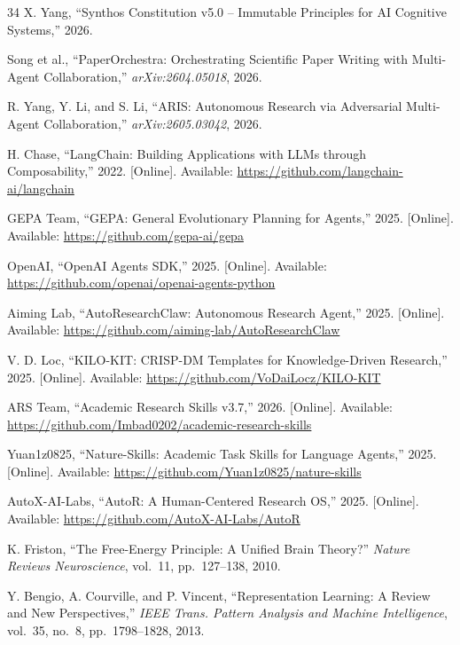 \documentclass[review]{elsarticle}
\begin{document}
\begin{thebibliography}{34}
X. Yang, ``Synthos Constitution v5.0 -- Immutable Principles for AI Cognitive Systems,'' 2026.

Song et al., ``PaperOrchestra: Orchestrating Scientific Paper Writing with Multi-Agent Collaboration,'' \textit{arXiv:2604.05018}, 2026.

R. Yang, Y. Li, and S. Li, ``ARIS: Autonomous Research via Adversarial Multi-Agent Collaboration,'' \textit{arXiv:2605.03042}, 2026.

H. Chase, ``LangChain: Building Applications with LLMs through Composability,'' 2022. [Online]. Available: \url{https://github.com/langchain-ai/langchain}

GEPA Team, ``GEPA: General Evolutionary Planning for Agents,'' 2025. [Online]. Available: \url{https://github.com/gepa-ai/gepa}

OpenAI, ``OpenAI Agents SDK,'' 2025. [Online]. Available: \url{https://github.com/openai/openai-agents-python}

Aiming Lab, ``AutoResearchClaw: Autonomous Research Agent,'' 2025. [Online]. Available: \url{https://github.com/aiming-lab/AutoResearchClaw}

V. D. Loc, ``KILO-KIT: CRISP-DM Templates for Knowledge-Driven Research,'' 2025. [Online]. Available: \url{https://github.com/VoDaiLocz/KILO-KIT}

ARS Team, ``Academic Research Skills v3.7,'' 2026. [Online]. Available: \url{https://github.com/Imbad0202/academic-research-skills}

Yuan1z0825, ``Nature-Skills: Academic Task Skills for Language Agents,'' 2025. [Online]. Available: \url{https://github.com/Yuan1z0825/nature-skills}

AutoX-AI-Labs, ``AutoR: A Human-Centered Research OS,'' 2025. [Online]. Available: \url{https://github.com/AutoX-AI-Labs/AutoR}

K. Friston, ``The Free-Energy Principle: A Unified Brain Theory?'' \textit{Nature Reviews Neuroscience}, vol.~11, pp.~127--138, 2010.

Y. Bengio, A. Courville, and P. Vincent, ``Representation Learning: A Review and New Perspectives,'' \textit{IEEE Trans. Pattern Analysis and Machine Intelligence}, vol.~35, no.~8, pp.~1798--1828, 2013.


\end{thebibliography}
\end{document}
